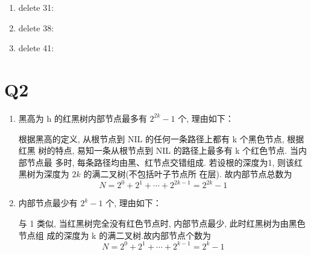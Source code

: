 \documentclass[UTF8]{ctexart}
\begin{document}
\begin{sloppypar}
\begin{enumerate}
            \item delete 31:

            \item delete 38:

            \item delete 41:

        \end{enumerate}

\section*{Q2}
    \begin{enumerate}
        \item 黑高为 h 的红黑树内部节点最多有 $2^{2k} - 1$ 个, 理由如下：

            根据黑高的定义, 从根节点到 NIL 的任何一条路径上都有 k 个黑色节点, 根据红黑
            树的特点, 易知一条从根节点到 NIL 的路径上最多有 k 个红色节点. 当内部节点最
            多时, 每条路径均由黑、红节点交错组成. 若设根的深度为1, 则该红黑树为深度为 $2k$ 的满二叉树(不包括叶子节点所
            在层). 故内部节点总数为 $$N = 2^0 + 2^1 + \cdots + 2^{2k-1} = 2^{2k
            } - 1$$
        \item 内部节点最少有 $2^k - 1$ 个, 理由如下：

            与 1 类似, 当红黑树完全没有红色节点时, 内部节点最少, 此时红黑树为由黑色节点组
            成的深度为 k 的满二叉树.故内部节点个数为 $$N = 2^0 + 2^1 + \cdots + 2^{k-1}
            = 2^k - 1$$
    \end{enumerate}


\end{sloppypar}
\end{document}
